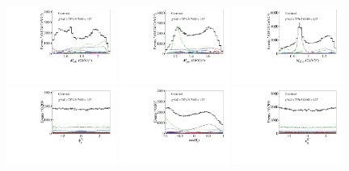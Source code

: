 \begin{figure}[htbp]\centering
    \includegraphics[width=0.32\textwidth]{figure/pwa_nominal/data_all_m_R_BC.pdf}
    \includegraphics[width=0.32\textwidth]{figure/pwa_nominal/data_all_m_R_BD.pdf}
    \includegraphics[width=0.32\textwidth]{figure/pwa_nominal/data_all_m_R_CD.pdf} \\
    \includegraphics[width=0.32\textwidth]{figure/pwa_nominal/data_all_Lmdc_p_alpha.pdf}
    \includegraphics[width=0.32\textwidth]{figure/pwa_nominal/data_all_Lmdc_p_cos_beta.pdf}
    \includegraphics[width=0.32\textwidth]{figure/pwa_nominal/data_all_R_CD_k_alpha.pdf} \\

\end{figure}

